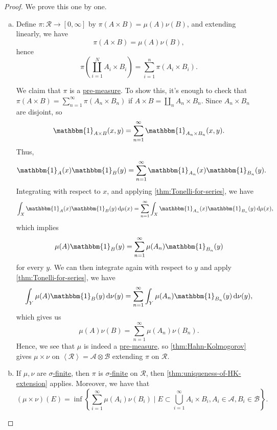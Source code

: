 \begin{proof}
	We prove this one by one.
	\begin{enumerate}[(a)]
		\item Define \(\pi \colon \mathcal{R} \to [0, \infty ]\) by \(\pi (A \times B) = \mu (A)\nu (B)\), and extending linearly, we have
		      \[
			      \pi (A\times B) = \mu (A)\nu (B),
		      \]
		      hence
		      \[
			      \pi \left(\coprod_{i=1}^{N} A_{i} \times B_{i} \right) = \sum_{i=1}^{n} \pi (A_{i} \times B_{i}).
		      \]

		      We claim that \(\pi \) is a \hyperref[def:pre-measure]{pre-measure}. To show this, it's enough to check that \(\pi (A\times B) = \sum_{n=1}^{\infty} \pi (A_{n} \times B_{n} )\)
		      if \(A\times B = \coprod_{n}A_{n} \times B_{n}  \). Since \(A_{n} \times B_{n} \) are disjoint, so
		      \[
			      \mathbbm{1}_{A\times B}(x, y) = \sum_{n=1}^{\infty} \mathbbm{1}_{A_{n} \times B_{n} }(x, y).
		      \]
		      Thus,
		      \[
			      \mathbbm{1}_{A} (x)\mathbbm{1}_{B} (y) = \sum_{n=1}^{\infty} \mathbbm{1}_{A_{n} }(x)\mathbbm{1}_{B_{n}}(y).
		      \]
		      Integrating with respect to \(x\), and applying \autoref{thm:Tonelli-for-series}, we have
		      \[
			      \int _X \mathbbm{1}_{A} (x)\mathbbm{1}_{B}(y)\,\mathrm{d} \mu (x) = \sum_{n=1}^{\infty} \int _X \mathbbm{1}_{A_{n} }(x)\mathbbm{1}_{B_{n} }(y)\,\mathrm{d} \mu (x),
		      \]
		      which implies
		      \[
			      \mu (A)\mathbbm{1}_{B} (y) = \sum_{n=1}^{\infty} \mu (A_{n} )\mathbbm{1}_{B_{n} }(y)
		      \]
		      for every \(y\). We can then integrate again with respect to \(y\) and apply \autoref{thm:Tonelli-for-series}, we have
		      \[
			      \int _Y \mu (A)\mathbbm{1}_{B}(y)\,\mathrm{d} \nu (y) = \sum_{n=1}^{\infty} \int _Y \mu (A_{n} )\mathbbm{1}_{B_{n} }(y)\,\mathrm{d} \nu (y),
		      \]
		      which gives us
		      \[
			      \mu (A)\nu (B) = \sum_{n=1}^{\infty} \mu (A_{n} )\nu (B_{n} ).
		      \]
		      Hence, we see that \(\mu\) is indeed a \hyperref[def:pre-measure]{pre-measure}, so \autoref{thm:Hahn-Kolmogorov} gives \(\mu \times \nu \) on \(\left< \mathcal{R}  \right> = \mathcal{A} \otimes \mathcal{B} \) extending \(\pi \) on \(\mathcal{R} \).
		\item If \(\mu , \nu \) are \hyperref[def:sigma-finite-measure]{\(\sigma\)-finite}, then \(\pi \) is  \hyperref[def:sigma-finite-measure]{\(\sigma\)-finite} on \(\mathcal{R} \), then \autoref{thm:uniqueness-of-HK-extension} applies. Moreover, we have that
		      \[
			      (\mu \times \nu )(E) = \inf \left\{\sum_{i=1}^{\infty} \mu (A_{i})\nu (B_{i})\mid E\subset \bigcup_{i=1}^{\infty} A_{i} \times B_{i}, A_{i} \in \mathcal{A} , B_{i} \in \mathcal{B} \right\}.
		      \]
	\end{enumerate}
\end{proof}


